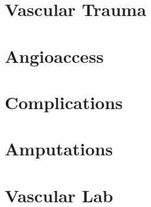 \documentclass[
]{book}
\begin{document}
\hypertarget{vascular-trauma}{%
\chapter{Vascular Trauma}\label{vascular-trauma}}

\hypertarget{section-5}{%
\section{}\label{section-5}}

\hypertarget{angioaccess}{%
\chapter{Angioaccess}\label{angioaccess}}

\hypertarget{section-6}{%
\section{}\label{section-6}}

\hypertarget{complications-1}{%
\chapter{Complications}\label{complications-1}}

\hypertarget{section-7}{%
\section{}\label{section-7}}

\hypertarget{amputations}{%
\chapter{Amputations}\label{amputations}}

\hypertarget{section-8}{%
\section{}\label{section-8}}

\hypertarget{vascular-lab}{%
\chapter{Vascular Lab}\label{vascular-lab}}

\hypertarget{section-9}{%
\section{}\label{section-9}}
\end{document}
